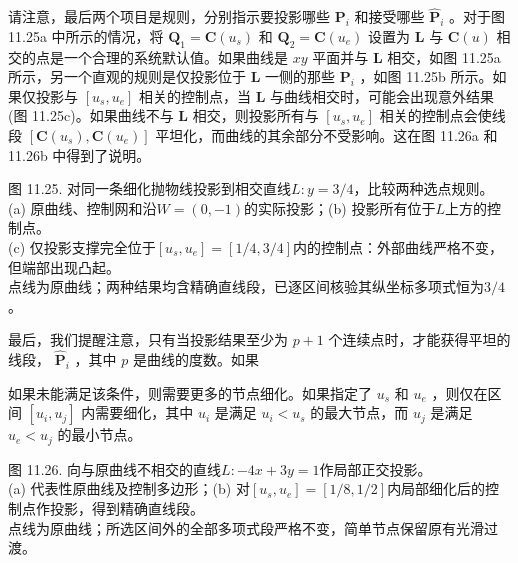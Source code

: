 \documentclass[../main.tex]{subfiles}
\begin{document}
请注意，最后两个项目是规则，分别指示要投影哪些 \({\mathbf{P}}_{i}\) 和接受哪些 \({\widehat{\mathbf{P}}}_{i}\) 。对于图 11.25a 中所示的情况，将 \({\mathbf{Q}}_{1} = \mathbf{C}\left( {u}_{s}\right)\) 和 \({\mathbf{Q}}_{2} = \mathbf{C}\left( {u}_{e}\right)\) 设置为 \(\mathbf{L}\) 与 \(\mathbf{C}\left( u\right)\) 相交的点是一个合理的系统默认值。如果曲线是 \({xy}\) 平面并与 \(\mathbf{L}\) 相交，如图 11.25a 所示，另一个直观的规则是仅投影位于 \(\mathbf{L}\) 一侧的那些 \({\mathbf{P}}_{i}\) ，如图 11.25b 所示。如果仅投影与 \(\left\lbrack  {{u}_{s},{u}_{e}}\right\rbrack\) 相关的控制点，当 \(\mathbf{L}\) 与曲线相交时，可能会出现意外结果(图 11.25c)。如果曲线不与 \(\mathbf{L}\) 相交，则投影所有与 \(\left\lbrack  {{u}_{s},{u}_{e}}\right\rbrack\) 相关的控制点会使线段 \(\left\lbrack  {\mathbf{C}\left( {u}_{s}\right) ,\mathbf{C}\left( {u}_{e}\right) }\right\rbrack\) 平坦化，而曲线的其余部分不受影响。这在图 11.26a 和 11.26b 中得到了说明。

\begin{center}
\begin{minipage}{37cm}
\centering
{}
\par\smallskip
图 11.25. 对同一条细化抛物线投影到相交直线$L:y=3/4$，比较两种选点规则。\\
(a) 原曲线、控制网和沿$W=(0,-1)$的实际投影；(b) 投影所有位于$L$上方的控制点。\\
(c) 仅投影支撑完全位于$[u_s,u_e]=[1/4,3/4]$内的控制点：外部曲线严格不变，但端部出现凸起。\\
点线为原曲线；两种结果均含精确直线段，已逐区间核验其纵坐标多项式恒为$3/4$。
\end{minipage}
\end{center}

最后，我们提醒注意，只有当投影结果至少为 \(p + 1\) 个连续点时，才能获得平坦的线段， \({\widehat{\mathbf{P}}}_{i}\) ，其中 \(p\) 是曲线的度数。如果



如果未能满足该条件，则需要更多的节点细化。如果指定了 \({u}_{s}\) 和 \({u}_{e}\) ，则仅在区间 \(\left\lbrack  {{u}_{i},{u}_{j}}\right\rbrack\) 内需要细化，其中 \({u}_{i}\) 是满足 \({u}_{i} < {u}_{s}\) 的最大节点，而 \({u}_{j}\) 是满足 \({u}_{e} < {u}_{j}\) 的最小节点。

\begin{center}
\begin{minipage}{37cm}
\centering
{}
\par\smallskip
图 11.26. 向与原曲线不相交的直线$L:-4x+3y=1$作局部正交投影。\\
(a) 代表性原曲线及控制多边形；(b) 对$[u_s,u_e]=[1/8,1/2]$内局部细化后的控制点作投影，得到精确直线段。\\
点线为原曲线；所选区间外的全部多项式段严格不变，简单节点保留原有光滑过渡。
\end{minipage}
\end{center}
\end{document}
